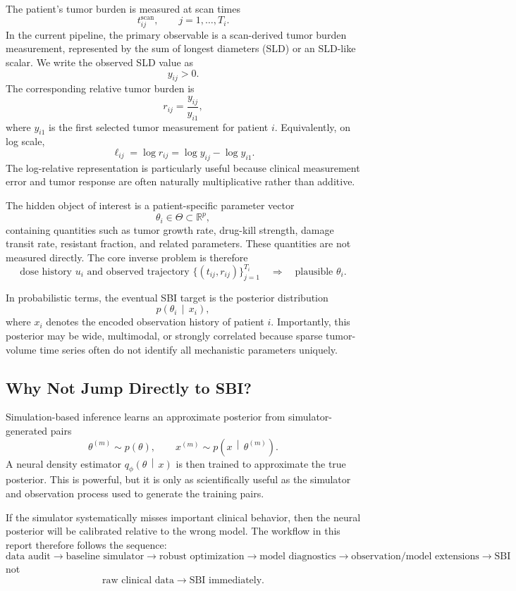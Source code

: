 \documentclass[11pt,a4paper]{article}
\newcommand{\R}{\mathbb{R}}
\newcommand{\given}{\,\middle|\,}
\begin{document}
The patient's tumor burden is measured at scan times
\[
    t_{ij}^{\mathrm{scan}}, \qquad j = 1,\ldots,T_i.
\]
In the current pipeline, the primary observable is a scan-derived tumor burden measurement, represented by the sum of longest diameters (SLD) or an SLD-like scalar. We write the observed SLD value as
\[
    y_{ij} > 0.
\]
The corresponding relative tumor burden is
\[
    r_{ij}
    = \frac{y_{ij}}{y_{i1}},
\]
where $y_{i1}$ is the first selected tumor measurement for patient $i$. Equivalently, on log scale,
\[
    \ell_{ij}
    = \log r_{ij}
    = \log y_{ij} - \log y_{i1}.
\]
The log-relative representation is particularly useful because clinical measurement error and tumor response are often naturally multiplicative rather than additive.

The hidden object of interest is a patient-specific parameter vector
\[
    \theta_i \in \Theta \subset \R^p,
\]
containing quantities such as tumor growth rate, drug-kill strength, damage transit rate, resistant fraction, and related parameters. These quantities are not measured directly. The core inverse problem is therefore
\[
    \text{dose history } u_i \text{ and observed trajectory } \{(t_{ij}, r_{ij})\}_{j=1}^{T_i}
    \quad \Longrightarrow \quad
    \text{plausible } \theta_i.
\]

In probabilistic terms, the eventual SBI target is the posterior distribution
\[
    p(\theta_i \given x_i),
\]
where $x_i$ denotes the encoded observation history of patient $i$. Importantly, this posterior may be wide, multimodal, or strongly correlated because sparse tumor-volume time series often do not identify all mechanistic parameters uniquely.

\subsection{Why Not Jump Directly to SBI?}

Simulation-based inference learns an approximate posterior from simulator-generated pairs
\[
    \theta^{(m)} \sim p(\theta),
    \qquad
    x^{(m)} \sim p(x \given \theta^{(m)}).
\]
A neural density estimator $q_\phi(\theta \given x)$ is then trained to approximate the true posterior. This is powerful, but it is only as scientifically useful as the simulator and observation process used to generate the training pairs.

If the simulator systematically misses important clinical behavior, then the neural posterior will be calibrated relative to the wrong model. The workflow in this report therefore follows the sequence:
\[
\boxed{
\text{data audit}
\rightarrow
\text{baseline simulator}
\rightarrow
\text{robust optimization}
\rightarrow
\text{model diagnostics}
\rightarrow
\text{observation/model extensions}
\rightarrow
\text{SBI}
}
\]
not
\[
    \text{raw clinical data} \rightarrow \text{SBI immediately}.
\]
\end{document}
